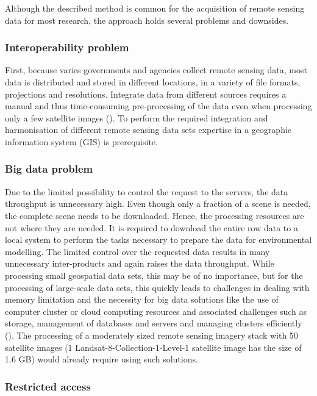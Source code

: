 Although the described method is common for the acquisition of remote sensing data for most research, the approach holds several problems and downsides.

\subsubsection{Interoperability problem}
First, because varies governments and agencies collect remote sensing data, most data is distributed and stored in different locations, in a variety of file formats, projections and resolutions. Integrate data from different sources requires a manual and thus time-consuming pre-processing of the data even when processing only a few satellite images (\cite{schell2000geodata}). To perform the required integration and harmonisation of different remote sensing data sets expertise in a geographic information system (GIS) is prerequisite.

\subsubsection{Big data problem}

Due to the limited possibility to control the request to the servers, the data throughput is unnecessary high. Even though only a fraction of a scene is needed, the complete scene needs to be downloaded. Hence, the processing resources are not where they are needed. It is required to download the entire row data to a local system to perform the tasks necessary to prepare the data for environmental modelling. The limited control over the requested data results in many unnecessary inter-products and again raises the data throughput. While processing small geospatial data sets, this may be of no importance, but for the processing of large-scale data sets, this quickly leads to challenges in dealing with memory limitation and the necessity for big data solutions like the use of computer cluster or cloud computing resources and associated challenges such as storage, management of databases and servers and managing clusters efficiently (\cite{gorelick2017google}). 
The processing of a moderately sized remote sensing imagery stack with 50 satellite images (1 Landsat-8-Collection-1-Level-1 satellite image has the size of 1.6 GB) would already require using such solutions.

\subsubsection{Restricted access}

